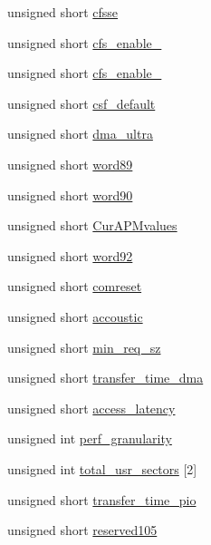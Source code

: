 \begin{DoxyCompactItemize}
\item 
unsigned short \hyperlink{structSATA__ident_a9d98244646733dfe714c46d0e8a58ecd}{cfsse}
\item 
unsigned short \hyperlink{structSATA__ident_acb6d9e0d24967112a83d6e195f77469a}{cfs\+\_\+enable\+\_}
\item 
unsigned short \hyperlink{structSATA__ident_af76747e91afd940fbe5c4c05ee0b6396}{cfs\+\_\+enable\+\_}
\item 
unsigned short \hyperlink{structSATA__ident_ab29fc72ea1317ab5f5d06d59ab7b84ff}{csf\+\_\+default}
\item 
unsigned short \hyperlink{structSATA__ident_a16f42ed6bf33839490b8684e77801f41}{dma\+\_\+ultra}
\item 
unsigned short \hyperlink{structSATA__ident_ac3c1a0f34c6c77762de11b4a1995914a}{word89}
\item 
unsigned short \hyperlink{structSATA__ident_a2c2baf9509a80f36e4e1ac4767937005}{word90}
\item 
unsigned short \hyperlink{structSATA__ident_a54577593de0dd4e949ad36a746325af0}{Cur\+A\+P\+Mvalues}
\item 
unsigned short \hyperlink{structSATA__ident_a8fb2a1e3cc82865443fa41f666ebe88b}{word92}
\item 
unsigned short \hyperlink{structSATA__ident_a6498b61fb0529b5e774dd2f633ea5fe6}{comreset}
\item 
unsigned short \hyperlink{structSATA__ident_ab35db051cb2210e01f0a316e61b90c76}{accoustic}
\item 
unsigned short \hyperlink{structSATA__ident_adbb9bf7c54a82fb330df2fd2bc58ded9}{min\+\_\+req\+\_\+sz}
\item 
unsigned short \hyperlink{structSATA__ident_a5b0a4388fb4ed0a5d087053c492ac6e8}{transfer\+\_\+time\+\_\+dma}
\item 
unsigned short \hyperlink{structSATA__ident_ab0d4a28726318540f1a23cb47e71a682}{access\+\_\+latency}
\item 
unsigned int \hyperlink{structSATA__ident_a6497132c3ec773dfe63a6d9e671bcd6b}{perf\+\_\+granularity}
\item 
unsigned int \hyperlink{structSATA__ident_a37e147644b63060f56f12605f8578441}{total\+\_\+usr\+\_\+sectors} \mbox{[}2\mbox{]}
\item 
unsigned short \hyperlink{structSATA__ident_a39b24989e9dc3b2c7c09434f64318cbf}{transfer\+\_\+time\+\_\+pio}
\item 
unsigned short \hyperlink{structSATA__ident_abf5b445f2faecb276859b5c8c7b7a5e6}{reserved105}

\end{DoxyCompactItemize}
